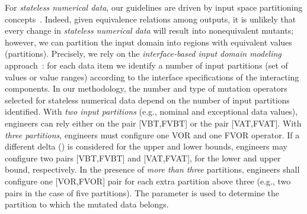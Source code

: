 For \emph{stateless numerical data}, our guidelines are driven by input space partitioning concepts~\cite{Ammann:Offutt:2008}.
Indeed, given equivalence relations among outputs, it is unlikely that every change in \emph{stateless numerical data} will result into nonequivalent mutants; however, we can partition the input domain into regions with equivalent values (partitions).
Precisely, we rely on the  
\emph{interface-based input domain modeling} approach~\cite{Ammann:Offutt:2008}:
for each data item we identify a number of input partitions (set of values or value ranges) according to the interface specifications of the interacting components.
In our methodology, the number and type of mutation operators selected for stateless numerical data depend on the number of input partitions identified.
With \emph{two input partitions} (e.g., nominal and exceptional data values), engineers can rely either on the pair [VBT,FVBT] or the pair [VAT,FVAT]. 
With \emph{three partitions}, engineers must configure one VOR and one FVOR operator. If a different delta (\D) is considered for the upper and lower bounds, engineers may configure two pairs [VBT,FVBT] and [VAT,FVAT], for the lower and upper bound, respectively. In the presence of \emph{more than three} partitions, engineers shall configure one [VOR,FVOR] pair for each extra partition above three (e.g., two pairs in the case of five partitions). The parameter \D{} is used to determine the partition to which the mutated data belongs. 


